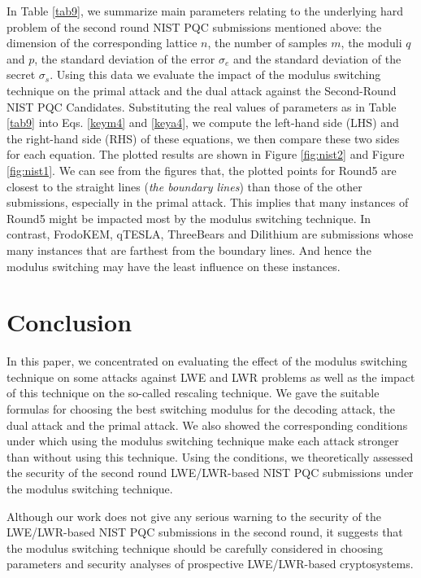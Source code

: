 \documentclass{cta-author}
\begin{document}
In Table \ref{tab9}, we summarize main parameters relating to the underlying hard problem of the second round NIST PQC submissions mentioned above: the dimension of the corresponding lattice $n$, the number of samples $m$, the moduli $q$ and $p$, the standard deviation of the error $\sigma_e$ and the standard deviation of  the secret $\sigma_s$. Using this data we evaluate the impact of the modulus switching technique on the primal  attack and the dual attack against the Second-Round NIST PQC Candidates. Substituting the real values of parameters as in Table \ref{tab9} into Eqs. \eqref{keym4} and \eqref{keya4}, we compute the left-hand side (LHS) and the right-hand side (RHS) of these equations, we then compare these two sides for each equation. The plotted results are shown in Figure \ref{fig:nist2} and Figure \ref{fig:nist1}. We can see from the figures that, the plotted points for Round5 are closest to the straight lines (\textit{the boundary lines}) than those of the other submissions, especially in the primal attack. This implies that many instances of Round5 might be impacted most by the modulus switching technique. In contrast, FrodoKEM, qTESLA, ThreeBears and Dilithium are submissions whose many instances that are farthest from the boundary lines. And hence the modulus switching may have the least influence on these instances.




\section{Conclusion} \label{conclu}

In this paper, we concentrated on evaluating the effect of the modulus switching technique on some attacks against LWE and LWR problems as well as the impact of this technique on the so-called rescaling technique. We gave the suitable formulas for choosing the best switching modulus for the decoding attack, the dual attack and the primal attack. We also showed the corresponding conditions under which using the modulus switching technique make each attack stronger than without using this technique. Using the conditions, we theoretically assessed the security of the second round LWE/LWR-based NIST PQC submissions under the modulus switching technique.


Although our work does not give any serious warning to the security of the LWE/LWR-based NIST PQC submissions in the second round, it suggests that the modulus switching technique should be carefully considered in choosing parameters and security analyses of prospective LWE/LWR-based cryptosystems. 
\end{document}
